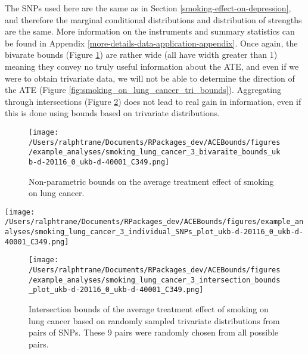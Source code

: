 \documentclass[
]{article}
\theoremstyle{plain}
\begin{document}
The SNPs used here are the same as in Section \ref{smoking-effect-on-depression}, and therefore the marginal conditional distributions and distribution of strengths are the same. More information on the instruments and summary statistics can be found in Appendix \ref{more-details-data-application-appendix}. Once again, the bivarate bounds (Figure \ref{fig:smoking_on_lung_cancer_ind_bounds}) are rather wide (all have width greater than 1) meaning they convey no truly useful information about the ATE, and even if we were to obtain trivariate data, we will not be able to determine the direction of the ATE (Figure \ref{fig:smoking_on_lung_cancer_tri_bounds}). Aggregating through intersections (Figure \ref{fig:smoking_on_lung_cancer_intersections}) does not lead to real gain in information, even if this is done using bounds based on trivariate distributions.

\begin{figure}[H]
  \texttt{[image: /Users/ralphtrane/Documents/RPackages\_dev/ACEBounds/figures/example\_analyses/smoking\_lung\_cancer\_3\_bivaraite\_bounds\_ukb-d-20116\_0\_ukb-d-40001\_C349.png]}
  \caption{Non-parametric bounds on the average treatment effect of smoking on lung cancer.}
  \label{fig:smoking_on_lung_cancer_ind_bounds}
\end{figure}

\clearpage

\begin{sidewaysfigure}
  \texttt{[image: /Users/ralphtrane/Documents/RPackages\_dev/ACEBounds/figures/example\_analyses/smoking\_lung\_cancer\_3\_individual\_SNPs\_plot\_ukb-d-20116\_0\_ukb-d-40001\_C349.png]}
    \caption{500 sets of bounds of the average treatment effect of smoking on lung cancer for each of the 84 SNPs. Each bound is based on a set of values for the trivariate distribution randomyl sampled. Bounds are color coded to show if they overlap 0 (grey) or do not (red). All bounds overlap 0.}
    \label{fig:smoking_on_lung_cancer_tri_bounds}
\end{sidewaysfigure}

\clearpage

\begin{figure}[H]
  \texttt{[image: /Users/ralphtrane/Documents/RPackages\_dev/ACEBounds/figures/example\_analyses/smoking\_lung\_cancer\_3\_intersection\_bounds\_plot\_ukb-d-20116\_0\_ukb-d-40001\_C349.png]}
  \caption{Intersection bounds of the average treatment effect of smoking on lung cancer based on randomly sampled trivariate distributions from pairs of SNPs. These 9 pairs were randomly chosen from all possible pairs.}
  \label{fig:smoking_on_lung_cancer_intersections}
\end{figure}
\end{document}

